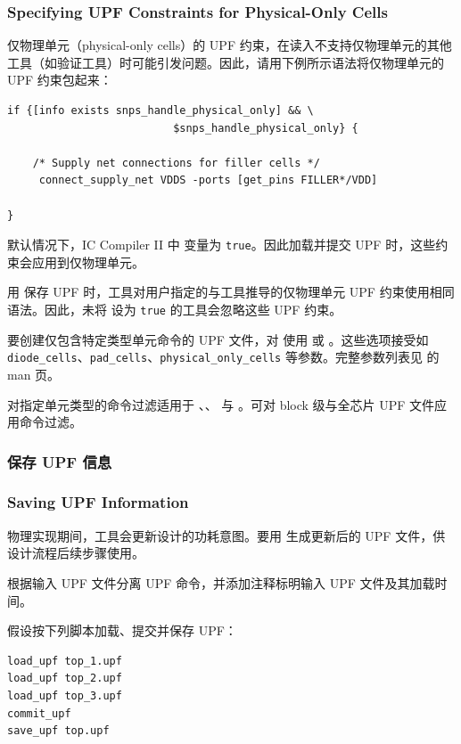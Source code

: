 \subsubsection*{Specifying UPF Constraints for Physical-Only Cells}

仅物理单元（physical-only cells）的 UPF 约束，在读入不支持仅物理单元的其他工具（如验证工具）时可能引发问题。因此，请用下例所示语法将仅物理单元的 UPF 约束包起来：
\begin{lstlisting}
if {[info exists snps_handle_physical_only] && \
                          $snps_handle_physical_only} {

    /* Supply net connections for filler cells */
     connect_supply_net VDDS -ports [get_pins FILLER*/VDD]

}
\end{lstlisting}

默认情况下，IC Compiler II 中  变量为 \texttt{true}。因此加载并提交 UPF 时，这些约束会应用到仅物理单元。

用  保存 UPF 时，工具对用户指定的与工具推导的仅物理单元 UPF 约束使用相同语法。因此，未将  设为 \texttt{true} 的工具会忽略这些 UPF 约束。

要创建仅包含特定类型单元命令的 UPF 文件，对  使用  或 。这些选项接受如 \texttt{diode\_cells}、\texttt{pad\_cells}、\texttt{physical\_only\_cells} 等参数。完整参数列表见  的 man 页。

对指定单元类型的命令过滤适用于 、、 与 。可对 block 级与全芯片 UPF 文件应用命令过滤。

\subsubsection{保存 UPF 信息}
\subsubsection*{Saving UPF Information}

物理实现期间，工具会更新设计的功耗意图。要用  生成更新后的 UPF 文件，供设计流程后续步骤使用。

 根据输入 UPF 文件分离 UPF 命令，并添加注释标明输入 UPF 文件及其加载时间。

假设按下列脚本加载、提交并保存 UPF：
\begin{lstlisting}
load_upf top_1.upf
load_upf top_2.upf
load_upf top_3.upf
commit_upf
save_upf top.upf
\end{lstlisting}

